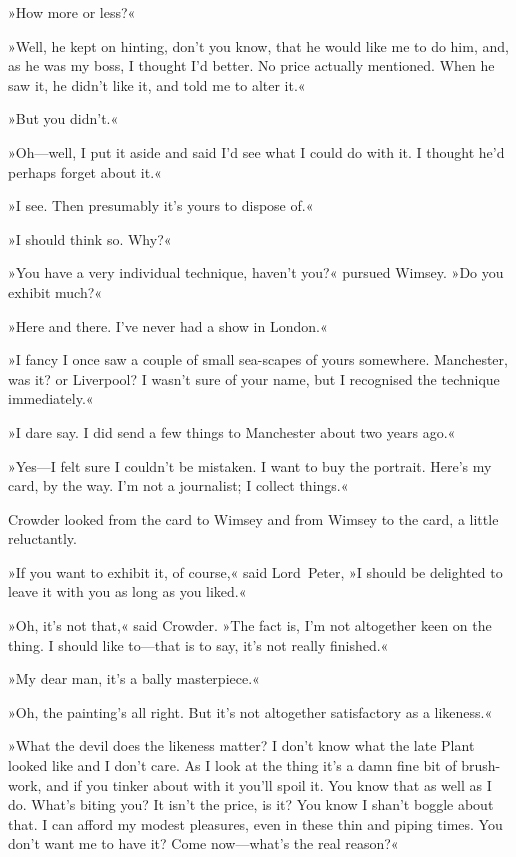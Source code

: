 »How more or less?«

»Well, he kept on hinting, don't you know, that he would like me to do him, and, as he was my boss, I thought I'd better. No price actually mentioned. When he saw it, he didn't like it, and told me to alter it.«

»But you didn't.«

»Oh—well, I put it aside and said I'd see what I could do with it. I thought he'd perhaps forget about it.«

»I see. Then presumably it's yours to dispose of.«

»I should think so. Why?«

»You have a very individual technique, haven't you?« pursued Wimsey. »Do you exhibit much?«

»Here and there. I've never had a show in London.«

»I fancy I once saw a couple of small sea-scapes of yours somewhere. Manchester, was it? or Liverpool? I wasn't sure of your name, but I recognised the technique immediately.«

»I dare say. I did send a few things to Manchester about two years ago.«

»Yes—I felt sure I couldn't be mistaken. I want to buy the portrait. Here's my card, by the way. I'm not a journalist; I collect things.«

Crowder looked from the card to Wimsey and from Wimsey to the card, a little reluctantly.

»If you want to exhibit it, of course,« said Lord~Peter, »I should be delighted to leave it with you as long as you liked.«

»Oh, it's not that,« said Crowder. »The fact is, I'm not altogether keen on the thing. I should like to—that is to say, it's not really finished.«

»My dear man, it's a bally masterpiece.«

»Oh, the painting's all right. But it's not altogether satisfactory as a likeness.«

»What the devil does the likeness matter? I don't know what the late Plant looked like and I don't care. As I look at the thing it's a damn fine bit of brush-work, and if you tinker about with it you'll spoil it. You know that as well as I do. What's biting you? It isn't the price, is it? You know I shan't boggle about that. I can afford my modest pleasures, even in these thin and piping times. You don't want me to have it? Come now—what's the real reason?«

